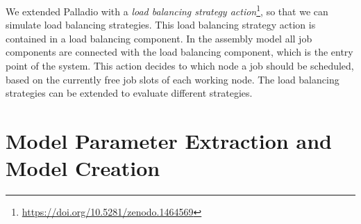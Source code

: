 \documentclass{webofc}
\newcommand{\footurl}[1]{\footnote{\url{#1}}}
\begin{document}
We extended Palladio with a \textit{load balancing strategy action}\footurl{https://doi.org/10.5281/zenodo.1464569}, so that we can simulate load balancing strategies.
This load balancing strategy action is contained in a load balancing component.
In the assembly model all job components are connected with the load balancing component, which is the entry point of the system.
This action decides to which node a job should be scheduled, based on the currently free job slots of each working node. The load balancing strategies can be extended to evaluate different strategies.



\section{Model Parameter Extraction and Model Creation}
\label{sec:param}
\end{document}

